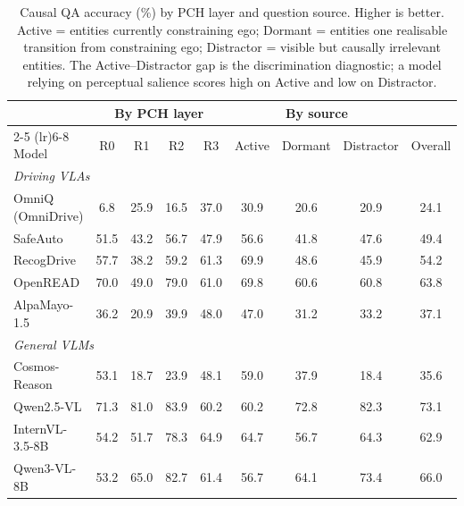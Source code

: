 \begin{table}[h!]
  \caption{Causal QA accuracy (\%) by PCH layer and question source. Higher is better. Active = entities currently constraining ego; Dormant = entities one realisable transition from constraining ego; Distractor = visible but causally irrelevant entities. The Active--Distractor gap is the discrimination diagnostic; a model relying on perceptual salience scores high on Active and low on Distractor.}
  \label{tab:qa_results}
  \centering
  \footnotesize
  \begin{tabular}{l c c c c c c c c}
    \toprule
    & \multicolumn{4}{c}{\textbf{By PCH layer}} & \multicolumn{3}{c}{\textbf{By source}} & \\
    \cmidrule(lr){2-5} \cmidrule(lr){6-8}
    Model & R0 & R1 & R2 & R3 & Active & Dormant & Distractor & Overall \\
    \midrule
    \multicolumn{9}{l}{\textit{Driving VLAs}} \\
    OmniQ (OmniDrive)                & 6.8 & 25.9 & 16.5 & 37.0 & 30.9 & 20.6 & 20.9 & 24.1 \\
    SafeAuto                         & 51.5 & 43.2 & 56.7 & 47.9 & 56.6 & 41.8 & 47.6 & 49.4 \\
    RecogDrive                       & 57.7 & 38.2 & 59.2 & 61.3 & 69.9 & 48.6 & 45.9 & 54.2 \\
    OpenREAD                         & 70.0 & 49.0 & 79.0 & 61.0 & 69.8 & 60.6 & 60.8 & 63.8 \\
    AlpaMayo-1.5                     & 36.2 & 20.9 & 39.9 & 48.0 & 47.0 & 31.2 & 33.2 & 37.1 \\
    \midrule
    \multicolumn{9}{l}{\textit{General VLMs}} \\
    Cosmos-Reason                    & 53.1 & 18.7 & 23.9 & 48.1 & 59.0 & 37.9 & 18.4 & 35.6 \\
    Qwen2.5-VL                       & 71.3 & 81.0 & 83.9 & 60.2 & 60.2 & 72.8 & 82.3 & 73.1 \\
    InternVL-3.5-8B                  & 54.2 & 51.7 & 78.3 & 64.9 & 64.7 & 56.7 & 64.3 & 62.9 \\
    Qwen3-VL-8B                      & 53.2 & 65.0 & 82.7 & 61.4 & 56.7 & 64.1 & 73.4 & 66.0 \\
    \bottomrule
  \end{tabular}
\end{table}
